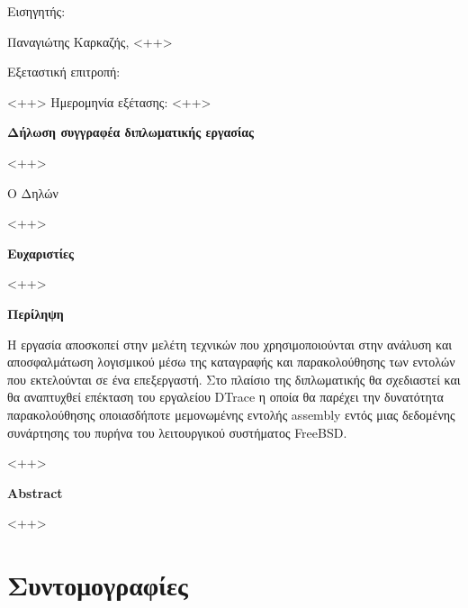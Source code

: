 \documentclass[12pt]{article}
\begin{document}
Εισηγητής:

\begin{center}
Παναγιώτης Καρκαζής, <++> %
\end{center}

Εξεταστική επιτροπή:

\begin{center}
<++>
\linebreak
\linebreak
Ημερομηνία εξέτασης: <++>
\end{center}

\pagebreak
\shipout\null

\begin{center}
\textbf{Δήλωση συγγραφέα διπλωματικής εργασίας}
\end{center}

<++>

\begin{center}
Ο Δηλών

<++> %
\end{center}

\pagebreak
\shipout\null

\begin{center}
\textbf{Ευχαριστίες}
\end{center}

<++>

\pagebreak
\shipout\null

\begin{center}
\textbf{Περίληψη}
\end{center}

Η εργασία αποσκοπεί στην μελέτη τεχνικών που χρησιμοποιούνται στην ανάλυση και
αποσφαλμάτωση λογισμικού μέσω της καταγραφής και παρακολούθησης των εντολών που
εκτελούνται σε ένα επεξεργαστή. Στο πλαίσιο της διπλωματικής θα σχεδιαστεί και
θα αναπτυχθεί επέκταση του εργαλείου DTrace η οποία θα παρέχει την δυνατότητα
παρακολούθησης οποιασδήποτε μεμονωμένης εντολής assembly εντός μιας δεδομένης
συνάρτησης του πυρήνα του λειτουργικού συστήματος FreeBSD.

<++> %

\begin{center}
\textbf{Abstract}
\end{center}

<++>

\pagebreak

\renewcommand{\contentsname}{Περιεχόμενα}
\tableofcontents
\pagebreak

\section{Συντομογραφίες}
\end{document}
